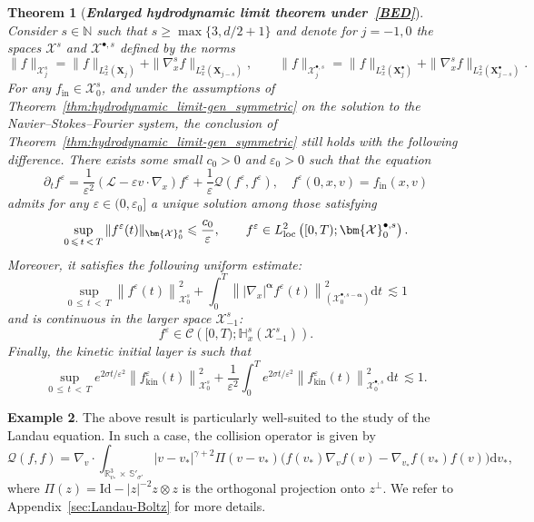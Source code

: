 \documentclass[10pt]{amsart}
\newtheorem{theo}{Theorem}[section]
\theoremstyle{definition}\newtheorem{defi}[theo]{Definition}\newtheorem{rema}[theo]{Remark}\newtheorem{exam}[theo]{Example}\newtheorem{exem}[theo]{Example}\newtheorem{nota}[theo]{Notation}
\newcommand{\ini}{\mathrm{in}}
\newcommand{\kin}{\mathrm{kin}}
\newcommand{\Id}{\mathrm{Id}}
\renewcommand{\d}{\mathrm{d}}
\newcommand{\R}{\mathbb{R}}
\renewcommand{\S}{\mathbb{S}}
\newcommand{\N}{\mathbb{N}}
\newcommand{\bbH}{\mathbb{H}}
\newcommand{\CC}{\mathcal{C}}
\newcommand{\XX}{\mathcal{X}}
\newcommand{\LL}{\mathcal{L}}
\newcommand{\QQ}{\mathcal{Q}}
\newcommand{\Sh}{\bm{X}}
\newcommand{\Shp}{\bm{X}^{\bullet}}
\newcommand{\rSSh}[1]{\bm{\XX}^{#1}}
\newcommand{\rSShp}[1]{\bm{\XX}^{\bullet, #1}}
\renewcommand*\le{\leqslant}
\renewcommand*\ge{\geqslant}
\newcommand*\eps{{\varepsilon}}
\begin{document}
\begin{theo}[\emph{\textbf{Enlarged hydrodynamic limit theorem under~\eqref{BED}}}]\label{thm:hydrodynamic_limit-gen_degenerate}
Consider $s \in \N$ such that $s \ge \max\{3, d/2 + 1\}$ and denote for $j = -1, 0$ the spaces $\rSSh{s}$ and $\rSShp{s}$ defined by the norms
\[
\|f\|_{\rSSh{s}_j} = \| f \|_{ L^2_x \left(\Sh_j \right) } + \| \nabla_x^s f \|_{ L^2_x\left(\Sh_{j-s}\right) },
\qquad \|f\|_{\rSShp{s}_j} = \| f \|_{ L^2_x \left(\Shp_j \right) } + \| \nabla_x^s f \|_{ L^2_x \left(\Shp_{j-s}\right) }.
\]
For any $f_\ini \in \rSSh{s}_0$, and under the assumptions of Theorem~\ref{thm:hydrodynamic_limit-gen_symmetric} on the solution to the Navier--Stokes--Fourier system, the conclusion of Theorem~\ref{thm:hydrodynamic_limit-gen_symmetric} still holds with the following difference. There exists some small $c_0 > 0$ and $\eps_0 > 0$ such that the equation
\[
\partial_t f^\eps = \frac{1}{\eps^2} \left(\LL - \eps v \cdot \nabla_x \right) f^\eps + \frac{1}{\eps} \QQ\left(f^\eps, f^\eps \right), \quad f^\eps(0, x, v) = f_\ini(x, v)
\]
admits for any $\eps \in (0, \eps_0]$ a unique solution among those satisfying
\[
\sup_{0\,\le\,t\,<\,T} \| f^\eps(t) \|_{ \rSSh{s}_0 } \le \frac{c_0}{\eps}, \qquad f^\eps \in L^2_{\rm{loc}} \left([0, T) ; \rSShp{s}_0 \right).
\]
Moreover, it satisfies the following uniform estimate:
\[
\sup_{0\,\le\,t\,<\,T} \left\| f^\eps(t) \right\|_{ \rSSh{s}_0 }^2 + \int_0^T \left\| | \nabla_x |^{ \bm \alpha } f^\eps(t) \right\|_{ \left(\rSShp{s-\boldsymbol{\alpha}}_0 \right) }^2 \d t \, \lesssim 1
\]
and is continuous in the larger space $\rSSh{s}_{-1}$:
\[
f^\eps \in \CC\left([0, T) ; \bbH^s_x \left(\rSSh{s}_{-1} \right) \right).
\]
Finally, the kinetic initial layer is such that
\[
\sup_{0\,\le\,t\,<\,T} e^{2 \sigma t / \eps^2} \left\| f^\eps_\kin(t) \right\|_{ \rSSh{s}_0 }^2 + \frac{1}{\eps^2} \int_0^T e^{2 \sigma t / \eps^2} \left\| f^\eps_\kin(t) \right\|_{ \rSShp{s}_0 }^2 \, \d t \, {\lesssim 1}.
\]
\end{theo}

\begin{exem}
The above result is particularly well-suited to the study of the Landau equation. In such a case, the collision operator is given by
\begin{equation*}
\QQ(f, f) = \nabla_v \cdot \int_{\R^3_{v_*}\,\times\,\S'_{\sigma'}} | v - v_* |^{\gamma+2} \Pi(v-v_*) \Big(f(v_*) \nabla_v f(v) - \nabla_{v_*} f(v_*) f(v) \Big) \d v_*,
\end{equation*}
where $\Pi(z) = \Id - |z|^{-2} z \otimes z$ is the orthogonal projection onto $z^\perp$. We refer to Appendix~\ref{sec:Landau-Boltz} for more details.
\end{exem}
\end{document}
